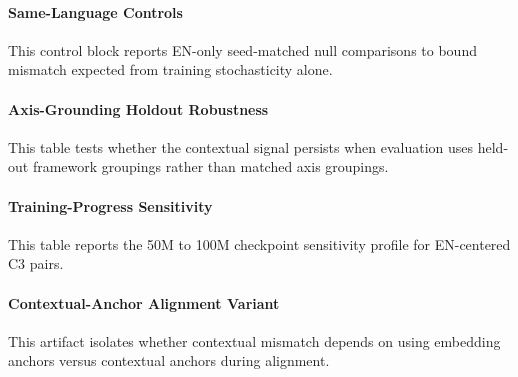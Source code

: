 \documentclass[11pt]{article}
\begin{document}
\paragraph{Same-Language Controls}
This control block reports EN-only seed-matched null comparisons to bound mismatch expected from training stochasticity alone.
\begin{table}[t]
\centering
\scriptsize
\resizebox{\columnwidth}{!}{}
\caption{EN-only seed-matched null controls (same data and budget, different random seeds).}
\label{tab:same-language-controls}
\end{table}

\paragraph{Axis-Grounding Holdout Robustness}
This table tests whether the contextual signal persists when evaluation uses held-out framework groupings rather than matched axis groupings.
\begin{table}[t]
\centering
\scriptsize
\resizebox{\columnwidth}{!}{}
\caption{Category/framework holdout check: matched-axis and held-out-axis contextual mismatch remain elevated.}
\label{tab:framework-holdout}
\end{table}

\paragraph{Training-Progress Sensitivity}
This table reports the 50M to 100M checkpoint sensitivity profile for EN-centered C3 pairs.
\begin{table}[t]
\centering
\scriptsize
\resizebox{\columnwidth}{!}{}
\caption{Sensitivity from 50M to 100M checkpoints in EN-centered C3 pairs.}
\label{tab:progress-sensitivity}
\end{table}

\paragraph{Contextual-Anchor Alignment Variant}
This artifact isolates whether contextual mismatch depends on using embedding anchors versus contextual anchors during alignment.
\begin{table}[t]
\centering
\scriptsize
\resizebox{0.95\textwidth}{!}{}
\caption{Contextual-space alignment variant for EN-centered pairs. The contextual axis gap remains large under both embedding- and contextual-anchor alignment.}
\label{tab:appendix-contextual-align}
\end{table}
\end{document}
